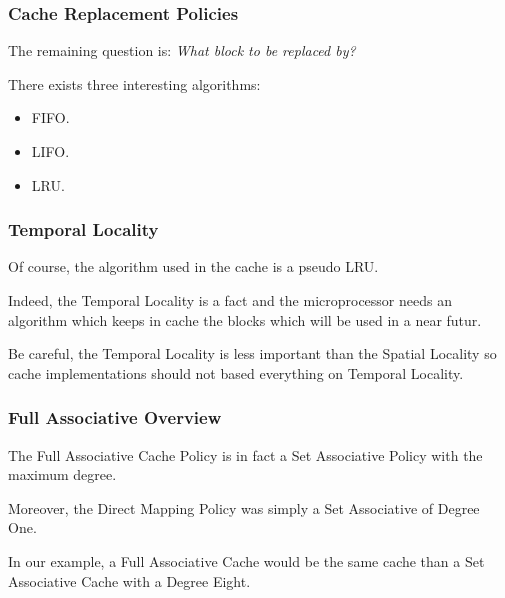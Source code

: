 
\begin{frame}
  \frametitle{Cache Replacement Policies}

  The remaining question is: \textit{What block to be replaced by?}

  \-

  There exists three interesting algorithms:

  \begin{itemize}
    \item
      FIFO.
    \item
      LIFO.
    \item
      LRU.
  \end{itemize}
\end{frame}


\begin{frame}
  \frametitle{Temporal Locality}

  Of course, the algorithm used in the cache is a pseudo LRU.

  \-

  Indeed, the Temporal Locality is a fact and the microprocessor needs
  an algorithm which keeps in cache the blocks which will be used in a near
  futur.

  \-

  Be careful, the Temporal Locality is less important than the Spatial
  Locality so cache implementations should not based everything on
  Temporal Locality.

  \begin{center}
  \end{center}
\end{frame}


\begin{frame}
  \frametitle{Full Associative Overview}

  The Full Associative Cache Policy is in fact a Set Associative Policy
  with the maximum degree.

  \-

  Moreover, the Direct Mapping Policy was simply a Set Associative of
  Degree One.

  \-

  In our example, a Full Associative Cache would be the same cache than a
  Set Associative Cache with a Degree Eight.
\end{frame}


